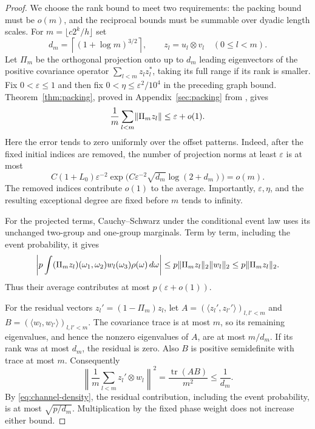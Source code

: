 \begin{proof}
We choose the rank bound to meet two requirements: the packing
bound must be $o(m)$, and the reciprocal bounds must be summable over
dyadic length scales. For $m=\lfloor c2^k/h\rfloor$ set
\begin{equation}\label{eq:channel-dimension}
 d_m=\left\lceil(1+\log m)^{3/2}\right\rceil,
 \qquad z_l=u_l\otimes v_l\quad(0\le l<m).
\end{equation}
Let $\Pi_m$ be the orthogonal projection onto up to $d_m$ leading
eigenvectors of the positive covariance operator
$\sum_{l<m}z_lz_l^*$, taking its full range if its rank is smaller.
Fix $0<\varepsilon\le1$ and then fix
$0<\eta\le\varepsilon^2/10^4$ in the preceding graph bound.
Theorem~\ref{thm:packing}, proved in Appendix~\ref{sec:packing} from
\cite[Theorem~4.1]{FourfoldCompanion}, gives
\begin{equation}\label{eq:channel-projected-average}
 \frac1m\sum_{l<m}\lVert\Pi_m z_l\rVert
       \le\varepsilon+o(1).
\end{equation}
Here the error tends to zero uniformly over the offset patterns.
Indeed, after the fixed initial indices are removed, the number of
projection norms at least $\varepsilon$ is at most
\[
 C(1+L_0)\varepsilon^{-2}
 \exp\!\bigl(C\varepsilon^{-2}\sqrt{d_m}\log(2+d_m)\bigr)=o(m).
\]
The removed indices contribute $o(1)$ to the average.  Importantly,
$\varepsilon,\eta$, and the resulting exceptional degree are fixed
before $m$ tends to infinity.

For the projected terms, Cauchy--Schwarz under the conditional event
law uses its unchanged two-group and one-group marginals.  Term by
term, including the event probability, it gives
\[
 \left|p\int (\Pi_mz_l)(\omega_1,\omega_2)
                   w_l(\omega_3)\rho(\omega)\,d\omega\right|
 \le p\lVert\Pi_mz_l\rVert_2\lVert w_l\rVert_2
 \le p\lVert\Pi_mz_l\rVert_2.
\]
Thus their average contributes at most $p(\varepsilon+o(1))$.

For the residual vectors $z_l'=(1-\Pi_m)z_l$, let
$A=(\langle z_l',z_{l'}'\rangle)_{l,l'<m}$ and
$B=(\langle w_l,w_{l'}\rangle)_{l,l'<m}$.  The covariance trace is
at most $m$, so its remaining eigenvalues, and hence the nonzero
eigenvalues of $A$, are at most $m/d_m$.  If its rank was at most
$d_m$, the residual is zero.  Also $B$ is positive semidefinite with
trace at most $m$.  Consequently
\[
 \left\|\frac1m\sum_{l<m}z_l'\otimes w_l\right\|^2
   =\frac{\operatorname{tr}(AB)}{m^2}\le\frac1{d_m}.
\]
By \eqref{eq:channel-density}, the residual contribution, including
the event probability, is at most $\sqrt{p/d_m}$.
Multiplication by the fixed phase weight does not increase either bound.


\end{proof}
